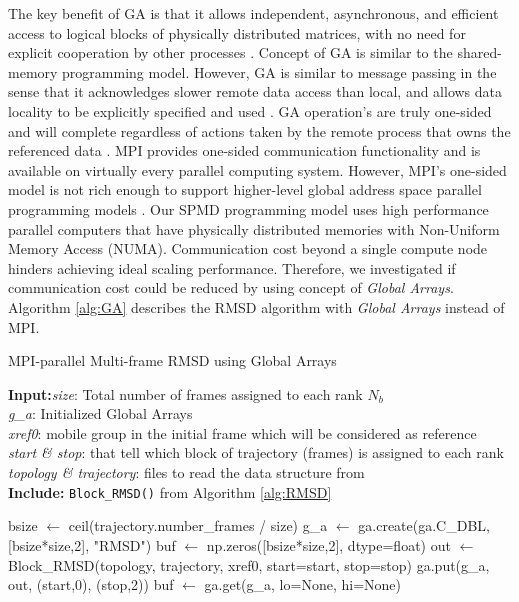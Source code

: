The key benefit of GA is that it allows independent, asynchronous, and efficient access to logical blocks of physically distributed matrices, with no need for explicit cooperation by other processes \cite{GA-NUMA}. 
Concept of GA is similar to the shared-memory programming model.
However, GA is similar to message passing in the sense that it acknowledges slower remote data access than local, and allows data locality to be explicitly specified and used \cite{GA-NUMA}. 
GA operation's are truly one-sided and will complete regardless of actions taken by the remote process that owns the referenced data \cite{GA-PNNL}. 
MPI provides one-sided communication functionality and is available on virtually every parallel computing system.
However, MPI's one-sided model is not rich enough to support higher-level global address space parallel programming models \cite{GA-PGAS}.
Our SPMD programming model uses high performance parallel computers that have physically distributed memories with Non-Uniform Memory Access (NUMA).
Communication cost beyond a single compute node hinders achieving ideal scaling performance.
Therefore, we investigated if communication cost could be reduced by using concept of \emph{Global Arrays}.
Algorithm \ref{alg:GA} describes the RMSD algorithm with \emph{Global Arrays} instead of MPI.

\begin{algorithm}[ht!]
	\scriptsize
	\caption{MPI-parallel Multi-frame RMSD using Global Arrays}
	\label{alg:GA}
	\hspace*{\algorithmicindent} \textbf{Input:}\emph{size}: Total number of frames assigned to each rank $N_{b}$\\
	\hspace*{\algorithmicindent} \emph{g\_a}: Initialized Global Arrays \\
	\hspace*{\algorithmicindent} \emph{xref0}: mobile group in the initial frame which will be considered as reference \\
	\hspace*{\algorithmicindent} \emph{start \& stop}: that tell which block of trajectory (frames) is assigned to each rank \\
	\hspace*{\algorithmicindent} \emph{topology \& trajectory}: files to read the data structure from \\
	\hspace*{\algorithmicindent}\textbf{Include:} \texttt{Block\_RMSD()} from Algorithm \ref{alg:RMSD}
	\begin{algorithmic}[1]
		
		\State bsize $\leftarrow$ ceil(trajectory.number\_frames / size)
		\State g\_a $\leftarrow$ ga.create(ga.C\_DBL, [bsize*size,2], "RMSD")
		\State buf $\leftarrow$ np.zeros([bsize*size,2], dtype=float)
		\State out $\leftarrow$ Block\_RMSD(topology, trajectory, xref0, start=start, stop=stop)
		\State ga.put(g\_a, out, (start,0), (stop,2))
		\State buf $\leftarrow$ ga.get(g\_a, lo=None, hi=None)
		\EndIf
	\end{algorithmic}
\end{algorithm}

